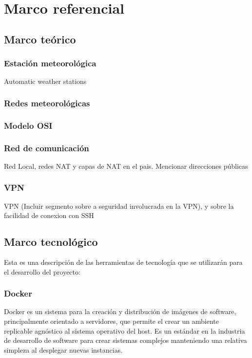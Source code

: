 \section{Marco referencial}

\subsection{Marco teórico}

\subsubsection{Estación meteorológica}

Automatic weather stations

\subsubsection{Redes meteorológicas}

\subsubsection{Modelo OSI}

\subsubsection{Red de comunicación}

Red Local, redes NAT y capas de NAT en el pais. Mencionar direcciones públicas

\subsubsection{VPN}

VPN (Incluir segmento sobre a seguridad involucrada en la VPN), y sobre la facilidad de conexion con SSH


\subsection{Marco tecnológico}

Esta es una descripción de las herramientas de tecnología que se utilizarán para el desarrollo del proyecto:

\subsubsection{Docker}

Docker es un sistema para la creación y distribución de imágenes de software, principalmente orientado a servidores, que permite el crear un ambiente replicable agnóstico al sistema operativo del host. Es un estándar en la industria de desarrollo de software para crear sistemas complejos manteniendo una relativa simpleza al desplegar nuevas instancias\cite{rad2017dockerAnalysis}.

